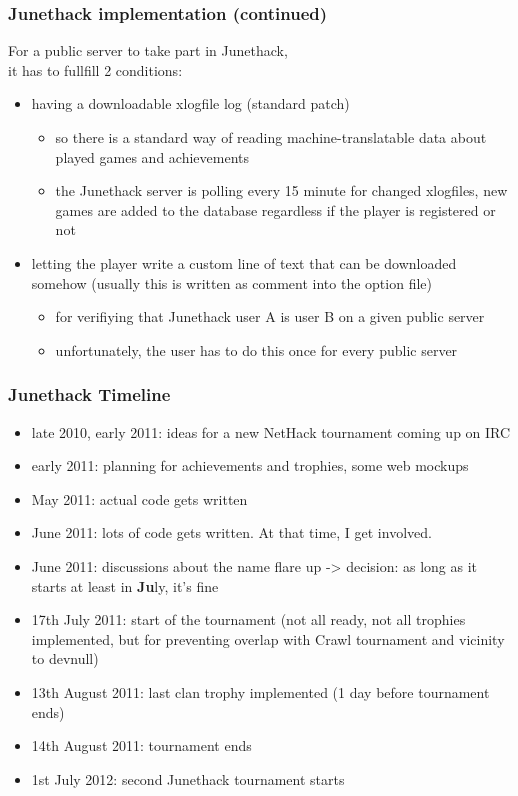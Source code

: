 \documentclass[handout]{beamer}
\begin{document}
\begin{frame}
\frametitle{Junethack implementation (continued)}
  For a public server to take part in Junethack,\\it has to fullfill 2 conditions:\pause
  \begin{itemize}[<+->]
    \item having a downloadable xlogfile log (standard patch)
    \begin{itemize}[<+->]
      \item so there is a standard way of reading machine-translatable data about played games and achievements
      \item the Junethack server is polling every 15 minute for changed xlogfiles, new games are added to the database regardless if the player is registered or not
    \end{itemize}
    \item letting the player write a custom line of text that can be downloaded somehow (usually this is written as comment into the option file)
    \begin{itemize}[<+->]
      \item for verifiying that Junethack user A is user B on a given public server
      \item unfortunately, the user has to do this once for every public server
    \end{itemize}
  \end{itemize}
\end{frame}

\begin{frame}
\frametitle{Junethack Timeline}
  \pause
  \begin{itemize}[<+->]
    \item late 2010, early 2011: ideas for a new NetHack tournament coming up on IRC
    \item early 2011: planning for achievements and trophies, some web mockups
    \item May 2011: actual code gets written
    \item June 2011: lots of code gets written. At that time, I get involved.
    \item June 2011: discussions about the name flare up -> decision: as long as it starts at least in \textbf{Ju}ly, it's fine
    \item 17th July 2011: start of the tournament (not all ready, not all trophies implemented, but for preventing overlap with Crawl tournament and vicinity to devnull)
    \item 13th August 2011: last clan trophy implemented (1 day before tournament ends)
    \item 14th August 2011: tournament ends
    \item 1st July 2012: second Junethack tournament starts
  \end{itemize}
\end{frame}
\end{document}

